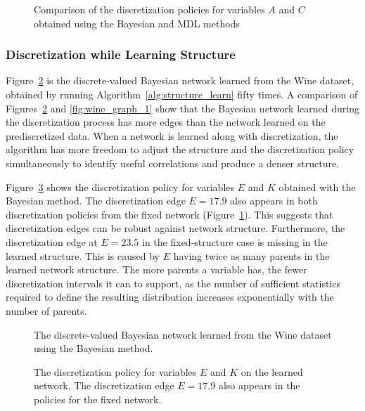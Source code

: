 \begin{figure}[ht]
  \centering
  
  \caption{Comparison of the discretization policies for variables $A$ and $C$ obtained using the Bayesian and MDL methods}
  \label{fig:wine_exp1_distr}
\end{figure}

\subsubsection{Discretization while Learning Structure}
\label{subsubsec:wine_exp2}

Figure~\ref{fig:wine_graph_2} is the discrete-valued Bayesian network learned from the Wine dataset, obtained by running Algorithm~\ref{alg:structure_learn} fifty times.
A comparison of Figures~\ref{fig:wine_graph_2} and \ref{fig:wine_graph_1} show that the Bayesian network learned during the discretization process has more edges than the network learned on the prediscretized data.
When a network is learned along with discretization, the algorithm has more freedom to adjust the structure and the discretization policy simultaneously to identify useful correlations and produce a denser structure.

Figure~\ref{fig:wine_exp2_distr} shows the discretization policy for variables $E$ and $K$ obtained with the Bayesian method.
The discretization edge $E = 17.9$ also appears in both discretization policies from the fixed network (Figure~\ref{fig:wine_exp1_distr}).
This suggests that discretization edges can be robust against network structure.
Furthermore, the discretization edge at $E = 23.5$ in the fixed-structure case is missing in the learned structure.
This is caused by $E$ having twice as many parents in the learned network structure.
The more parents a variable has, the fewer discretization intervals it can to support, as the number of sufficient statistics required to define the resulting distribution increases exponentially with the number of parents.

\begin{figure}[ht]
  \centering
  \scalebox{0.7}{}
  \caption{The discrete-valued Bayesian network learned from the Wine dataset using the Bayesian method.}
  \label{fig:wine_graph_2}
\end{figure}

\begin{figure}[ht]
  \centering
  
  \caption{
    The discretization policy for variables $E$ and $K$ on the learned network.
    The discretization edge $E = 17.9$ also appears in the policies for the fixed network.
  }
  \label{fig:wine_exp2_distr}
\end{figure}
%
%
